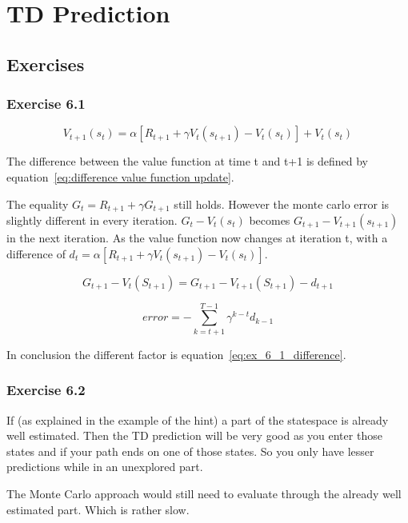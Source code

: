 \chapter{TD Prediction}

\section{Exercises}

\subsection{Exercise 6.1}

\begin{equation}
V_{t+1}(s_{t}) = \alpha [R_{t+1} + \gamma V_t(s_{t+1})-V_t(s_t)] + V_t(s_t)
\label{eq:difference value function update}
\end{equation}


The difference between the value function at time t and t+1 is defined by equation~\ref{eq:difference value function update}.

The equality $G_t = R_{t+1} + \gamma G_{t+1}$ still holds. However the monte carlo error is slightly different in every iteration. $G_t - V_t(s_t)$ becomes $G_{t+1} - V_{t+1}(s_{t+1})$ in the next iteration. As the value function now changes at iteration t, with a difference of  $d_t = \alpha [R_{t+1} + \gamma V_t(s_{t+1})-V_t(s_t)]$.

\begin{equation}
G_{t+1} - V_t(S_{t+1}) = G_{t+1} - V_{t+1}(S_{t+1})-d_{t+1}
\label{eq:single iteration difference}
\end{equation}

\begin{equation}
error = -\sum_{k=t+1}^{T-1} \gamma^{k-t} d_{k-1}
\label{eq:ex_6_1_difference}
\end{equation}

In conclusion the different factor is equation~\ref{eq:ex_6_1_difference}.

\subsection{Exercise 6.2}
If (as explained in the example of the hint) a part of the statespace is already well estimated. Then the TD prediction will be very good as you enter those states and if your path ends on one of those states. So you only have lesser predictions while in an unexplored part.

The Monte Carlo approach would still need to evaluate through the already well estimated part. Which is rather slow.


